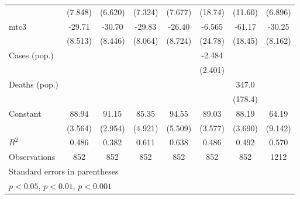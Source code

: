 \documentclass{article}
\begin{document}
{\begin{longtable}{l*{7}{c}}
                &  (7.848)         &  (6.620)         &  (7.324)         &  (7.677)         &  (18.74)         &  (11.60)         &  (6.896)         \\
mtc3            &   -29.71\sym{*}  &   -30.70\sym{*}  &   -29.83\sym{*}  &   -26.40\sym{*}  &   -6.565         &   -61.17\sym{*}  &   -30.25\sym{*}  \\
                &  (8.513)         &  (8.446)         &  (8.064)         &  (8.724)         &  (24.78)         &  (18.45)         &  (8.162)         \\
Cases (pop.)    &                  &                  &                  &                  &   -2.484         &                  &                  \\
                &                  &                  &                  &                  &  (2.401)         &                  &                  \\
Deaths (pop.)   &                  &                  &                  &                  &                  &    347.0         &                  \\
                &                  &                  &                  &                  &                  &  (178.4)         &                  \\
Constant        &    88.94\sym{***}&    91.15\sym{***}&    85.35\sym{***}&    94.55\sym{***}&    89.03\sym{***}&    88.19\sym{***}&    64.19\sym{***}\\
                &  (3.564)         &  (2.954)         &  (4.921)         &  (5.509)         &  (3.577)         &  (3.690)         &  (9.142)         \\
\hline
\(R^{2}\)       &    0.486         &    0.382         &    0.611         &    0.638         &    0.486         &    0.492         &    0.570         \\
Observations    &      852         &      852         &      852         &      852         &      852         &      852         &     1212         \\
\hline\hline
\multicolumn{8}{l}{\footnotesize Standard errors in parentheses}\\
\multicolumn{8}{l}{\footnotesize \sym{*} \(p<0.05\), \sym{**} \(p<0.01\), \sym{***} \(p<0.001\)}\\
\end{longtable}
}
\end{document}
